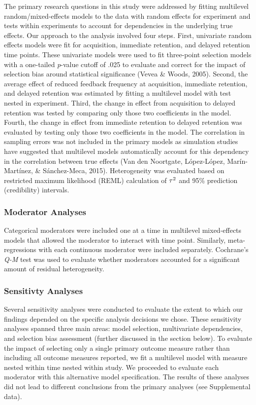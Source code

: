 \documentclass[
  english,
  man,mask,floatsintext]{apa7}
\begin{document}
The primary research questions in this study were addressed by fitting multilevel random/mixed-effects models to the data with random effects for experiment and tests within experiments to account for dependencies in the underlying true effects. Our approach to the analysis involved four steps. First, univariate random effects models were fit for acquisition, immediate retention, and delayed retention time points. These univariate models were used to fit three-point selection models with a one-tailed \emph{p}-value cutoff of .025 to evaluate and correct for the impact of selection bias around statistical significance (Vevea \& Woods, 2005). Second, the average effect of reduced feedback frequency at acquisition, immediate retention, and delayed retention was estimated by fitting a multilevel model with test nested in experiment. Third, the change in effect from acquisition to delayed retention was tested by comparing only those two coefficients in the model. Fourth, the change in effect from immediate retention to delayed retention was evaluated by testing only those two coefficients in the model. The correlation in sampling errors was not included in the primary models as simulation studies have suggested that multilevel models automatically account for this dependency in the correlation between true effects (Van den Noortgate, López-López, Marín-Martínez, \& Sánchez-Meca, 2015). Heterogeneity was evaluated based on restricted maximum likelihood (REML) calculation of \(\small\tau^2\) and 95\% prediction (credibility) intervals.

\hypertarget{moderator-analyses}{%
\subsubsection{Moderator Analyses}\label{moderator-analyses}}

Categorical moderators were included one at a time in multilevel mixed-effects models that allowed the moderator to interact with time point. Similarly, meta-regressions with each continuous moderator were included separately. Cochrane's \emph{Q-M} test was used to evaluate whether moderators accounted for a significant amount of residual heterogeneity.

\hypertarget{sensitivty-analyses}{%
\subsubsection{Sensitivty Analyses}\label{sensitivty-analyses}}

Several sensitivity analyses were conducted to evaluate the extent to which our findings depended on the specific analysis decisions we chose. These sensitivity analyses spanned three main areas: model selection, multivariate dependencies, and selection bias assessment (further discussed in the section below). To evaluate the impact of selecting only a single primary outcome measure rather than including all outcome measures reported, we fit a multilevel model with measure nested within time nested within study. We proceeded to evaluate each moderator with this alternative model specification. The results of these analyses did not lead to different conclusions from the primary analyses (see Supplemental data).
\end{document}
